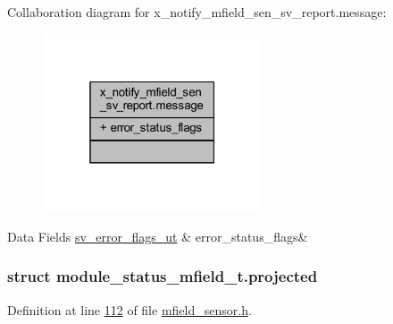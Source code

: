 Collaboration diagram for x\+\_\+notify\+\_\+mfield\+\_\+sen\+\_\+sv\+\_\+report.\+message\+:\nopagebreak
\begin{figure}[H]
\begin{center}
\leavevmode
\includegraphics[width=184pt]{d3/de5/a00956}
\end{center}
\end{figure}
\begin{DoxyFields}{Data Fields}
\hypertarget{a00019_a150dd23606edacb55873c2c2cd06807d}{\hyperlink{a00022_d2/d5a/a00792}{sv\+\_\+error\+\_\+flags\+\_\+ut}}\label{a00019_a150dd23606edacb55873c2c2cd06807d}
&
error\+\_\+status\+\_\+flags&
\\
\hline

\end{DoxyFields}
\label{d5/d0a/a00602}
\hypertarget{a00019_d5/d0a/a00602}{}
\subsubsection{struct module\+\_\+status\+\_\+mfield\+\_\+t.\+projected}


Definition at line \hyperlink{a00019_source_l00112}{112} of file \hyperlink{a00019_source}{mfield\+\_\+sensor.\+h}.



